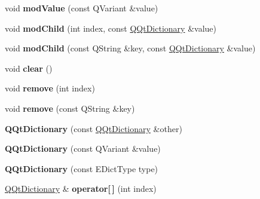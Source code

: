 \begin{DoxyCompactItemize}
void {\bfseries mod\+Value} (const Q\+Variant \&value)
\item 
\mbox{\label{class_q_qt_dictionary_a448801706d9ef233111c9261818b4e76}} 
void {\bfseries mod\+Child} (int index, const \mbox{\hyperlink{class_q_qt_dictionary}{Q\+Qt\+Dictionary}} \&value)
\item 
\mbox{\label{class_q_qt_dictionary_ac0f3befd7005f06b7a3633fed30f19f7}} 
void {\bfseries mod\+Child} (const Q\+String \&key, const \mbox{\hyperlink{class_q_qt_dictionary}{Q\+Qt\+Dictionary}} \&value)
\item 
\mbox{\label{class_q_qt_dictionary_a5cbeaae0e278ba55e5533a6a07102c4b}} 
void {\bfseries clear} ()
\item 
\mbox{\label{class_q_qt_dictionary_aca3b98717f725fa5343406c9d4b72b88}} 
void {\bfseries remove} (int index)
\item 
\mbox{\label{class_q_qt_dictionary_ab399be0a54ef404067ae178239982e7e}} 
void {\bfseries remove} (const Q\+String \&key)
\item 
\mbox{\label{class_q_qt_dictionary_a278d14ccfcd2d24ac0ceb9f7af4308e6}} 
{\bfseries Q\+Qt\+Dictionary} (const \mbox{\hyperlink{class_q_qt_dictionary}{Q\+Qt\+Dictionary}} \&other)
\item 
\mbox{\label{class_q_qt_dictionary_a2662ede343378c0172c963f7ba3658f5}} 
{\bfseries Q\+Qt\+Dictionary} (const Q\+Variant \&value)
\item 
\mbox{\label{class_q_qt_dictionary_af7c813a8667438a0635bc9951a008523}} 
{\bfseries Q\+Qt\+Dictionary} (const E\+Dict\+Type type)
\item 
\mbox{\label{class_q_qt_dictionary_a7ec61d302f16d8cbebd59f1d62254ded}} 
\mbox{\hyperlink{class_q_qt_dictionary}{Q\+Qt\+Dictionary}} \& {\bfseries operator\mbox{[}$\,$\mbox{]}} (int index)
\item 
\mbox{\label{class_q_qt_dictionary_af1c7639b7bbb4f57c03ff67b81b5ffcd}} 

\end{DoxyCompactItemize}
